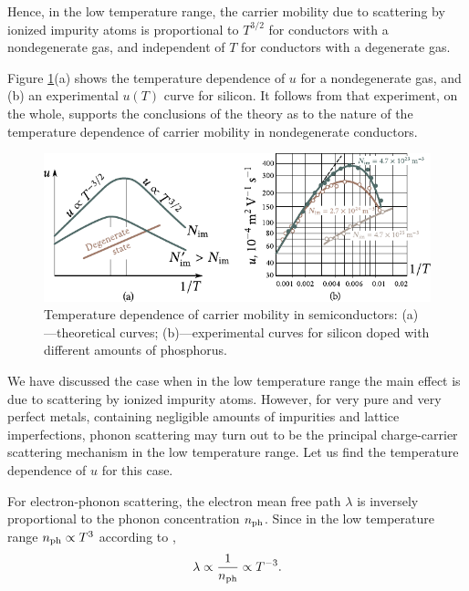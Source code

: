 Hence, in the low temperature range, the carrier mobility due to scattering by ionized impurity atoms is proportional to $T^{3/2}$ for conductors with a nondegenerate gas, and independent of $T$ for conductors with a degenerate gas.

Figure \ref{fig:6_7}(a) shows the temperature dependence of $u$ for a nondegenerate gas, and (b) an experimental $u(T)$ curve for silicon. It follows from  that experiment, on the whole,
supports the conclusions of the theory as to the nature of the temperature dependence of carrier mobility in nondegenerate conductors.

\begin{figure}[t]
	\begin{center}
		\includegraphics[scale=1]{figures/ch_06/fig_6_7.pdf}
		\caption[]{Temperature dependence of carrier mobility in semiconductors: (a)---theoretical curves; (b)---experimental curves for silicon doped with different amounts of phosphorus.}
		\label{fig:6_7}
	\end{center}
	\vspace{-0.7cm}
\end{figure}

We have discussed the case when in the low temperature range the main effect is due to scattering by ionized impurity atoms. However, for very pure and very perfect metals, containing negligible amounts of impurities and lattice imperfections, phonon scattering may turn out to be the principal charge-carrier scattering mechanism in the low temperature range. Let us find the temperature dependence of $u$ for this case.

For electron-phonon scattering, the electron mean free path $\lambda$ is inversely proportional to the phonon concentration $n_{\text{ph}}$. Since in the low temperature range $n_{\text{ph}}\propto T^3$ according to ,
\begin{equation}\label{eq:6_24}
	\lambda \propto \frac{1}{n_{\text{ph}}} \propto T^{-3}.
\end{equation}

